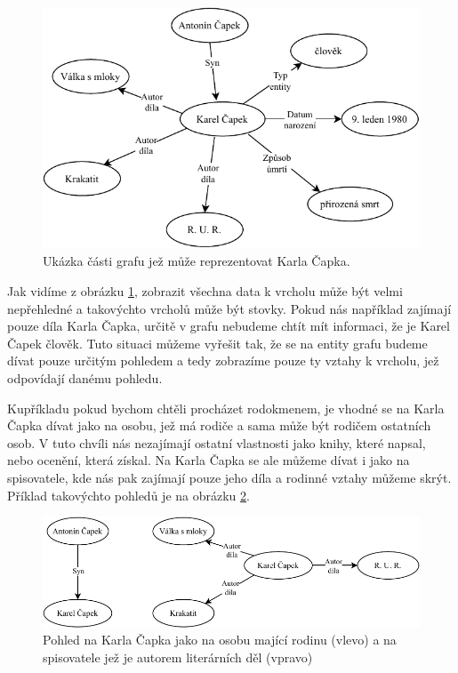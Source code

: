 \begin{figure}[h]
    \centering
    \includegraphics{media/capek-full.pdf}
    \caption{Ukázka části grafu jež může reprezentovat Karla Čapka.}
    \label{fig:capek-full}
\end{figure}

Jak vidíme z obrázku \ref{fig:capek-full}, zobrazit všechna data k vrcholu může být velmi nepřehledné a takovýchto vrcholů může být stovky. Pokud nás například zajímají pouze díla Karla Čapka, určitě v grafu nebudeme chtít mít informaci, že je Karel Čapek člověk. Tuto situaci můžeme vyřešit tak, že se na entity grafu budeme dívat pouze určitým pohledem a tedy zobrazíme pouze ty vztahy k vrcholu, jež odpovídají danému pohledu.

Kupříkladu pokud bychom chtěli procházet rodokmenem, je vhodné se na Karla Čapka dívat jako na osobu, jež má rodiče a sama může být rodičem ostatních osob. V tuto chvíli nás nezajímají ostatní vlastnosti jako knihy, které napsal, nebo ocenění, která získal. Na Karla Čapka se ale můžeme dívat i jako na spisovatele, kde nás pak zajímají pouze jeho díla a rodinné vztahy můžeme skrýt. Příklad takovýchto pohledů je na obrázku \ref{fig:capek-part}.

\begin{figure}[h]
    \centering
    \includegraphics{media/capek-part.pdf}
    \caption{Pohled na Karla Čapka jako na osobu mající rodinu (vlevo) a na spisovatele jež je autorem literárních děl (vpravo)}
    \label{fig:capek-part}
\end{figure}

